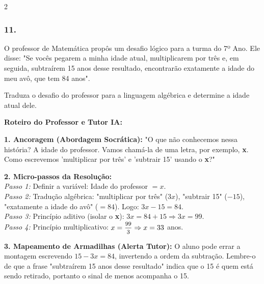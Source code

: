 \begin{multicols*}{2}
\subsubsection*{11.} 
\begin{enunciadoLiteral}
O professor de Matemática propôs um desafio lógico para a turma do 7º Ano. Ele disse: "Se vocês pegarem a minha idade atual, multiplicarem por três e, em seguida, subtraírem 15 anos desse resultado, encontrarão exatamente a idade do meu avô, que tem 84 anos". 

Traduza o desafio do professor para a linguagem algébrica e determine a idade atual dele.
\end{enunciadoLiteral}

\ifgabarito
    \begin{tcolorbox}[colback=CorTitUm!5, colframe=CorTitUm, boxrule=1pt, arc=4pt, left=6pt, right=6pt, top=6pt, bottom=6pt]
    \small\textbf{\textcolor{CorTitUm}{Roteiro do Professor e Tutor IA:}}\par\vspace{0.1cm}
    \color{CinzaEscuro}
    \textbf{1. Ancoragem (Abordagem Socrática):} "O que não conhecemos nessa história? A idade do professor. Vamos chamá-la de uma letra, por exemplo, \textbf{x}. Como escrevemos 'multiplicar por três' e 'subtrair 15' usando o \textbf{x}?"\par\vspace{0.1cm}
    
    \textbf{2. Micro-passos da Resolução:}\\
    \textit{Passo 1:} Definir a variável: Idade do professor $= x$.\\
    \textit{Passo 2:} Tradução algébrica: "multiplicar por três" ($3x$), "subtrair 15" ($- 15$), "exatamente a idade do avô" ($= 84$). Logo: $3x - 15 = 84$.\\
    \textit{Passo 3:} Princípio aditivo (isolar o \textbf{x}): $3x = 84 + 15 \Rightarrow 3x = 99$.\\
    \textit{Passo 4:} Princípio multiplicativo: $x = \mfrac{99}{3} \Rightarrow x = 33$ anos.\par\vspace{0.1cm}
    
    \textbf{3. Mapeamento de Armadilhas (Alerta Tutor):} O aluno pode errar a montagem escrevendo $15 - 3x = 84$, invertendo a ordem da subtração. Lembre-o de que a frase "subtraírem 15 anos desse resultado" indica que o 15 é quem está sendo retirado, portanto o sinal de menos acompanha o 15.
    \end{tcolorbox}
    \vspace{0.15cm}
    

\end{multicols*}
